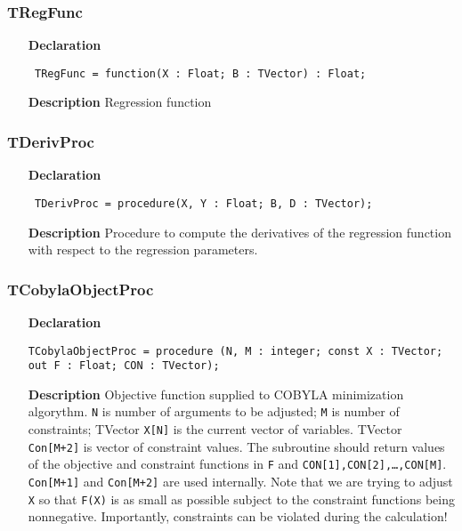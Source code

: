 \documentclass[12pt,a4paper,oneside]{report}
\newcommand{\lmatha}[1]{   %
	\marginpar{\vspace{#1} 
		\begin{flushright}
			LMath 0.5
	\end{flushright} }
}
\newcommand{\declarationitem}[1]{\textbf{#1}}
\newcommand{\descriptiontitle}[1]{\textbf{#1}}
\newcommand{\code}[1]{\texttt{#1}}
\begin{document}
\subsubsection{TRegFunc}
\label{utypes-TRegFunc}
\begin{itemize}\item[\declarationitem{Declaration}\hfill]
	\begin{flushleft}
		\code{
			TRegFunc = function(X : Float; B : TVector) : Float;}
	\end{flushleft}
	\item[\descriptiontitle{Description}]
	Regression function
\end{itemize}
\subsubsection{TDerivProc}
\label{utypes-TDerivProc}
\begin{itemize}\item[\declarationitem{Declaration}\hfill]
	\begin{flushleft}
		\code{
			TDerivProc = procedure(X, Y : Float; B, D : TVector);}
	\end{flushleft}
	\par
	\item[\descriptiontitle{Description}]
	Procedure to compute the derivatives of the regression function with respect to the regression parameters.
\end{itemize}
\subsubsection{TCobylaObjectProc}\lmatha{-28pt}
\label{utypes_TCobylaObjectProc}
\begin{itemize}
	\item[\declarationitem{Declaration}\hfill]
	\begin{flushleft}
	\code{TCobylaObjectProc = procedure (N, M : integer; const X : TVector; out F : Float; CON : TVector);}
	\end{flushleft}
	\item[\descriptiontitle{Description}]
	Objective function supplied to COBYLA minimization algorythm.
	\code{N} is number of arguments to be adjusted;
	\code{M} is number of constraints;
	TVector \code{X[N]} is the current vector of variables.
	TVector \code{Con[M+2]} is vector of constraint values. The subroutine should return values of the objective and constraint functions in \code{F} and \code{CON[1],CON[2],\dots,CON[M]}. \code{Con[M+1]} and \code{Con[M+2]} are used internally. Note that we are trying to adjust \code{X} so that \code{F(X)} is as small as possible subject to the constraint functions
	being nonnegative. Importantly, constraints can be violated during the calculation!
\end{itemize}
\end{document}
